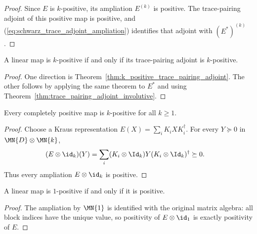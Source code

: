\begin{proof}
    \leanok
    Since $E$ is $k$-positive, its ampliation $E^{(k)}$ is positive. The
    trace-pairing adjoint of this positive map is positive, and
    (\ref{eq:schwarz_trace_adjoint_ampliation}) identifies that adjoint with
    $(E^*)^{(k)}$.
\end{proof}

\begin{theorem}
    \label{thm:k_positive_trace_pairing_adjoint_iff}
    \leanok
    A linear map is $k$-positive if and only if its trace-pairing adjoint is
    $k$-positive.
\end{theorem}

\begin{proof}
    \leanok
    One direction is
    Theorem~\ref{thm:k_positive_trace_pairing_adjoint}. The other follows by
    applying the same theorem to $E^*$ and using
    Theorem~\ref{thm:trace_pairing_adjoint_involutive}.
\end{proof}

\begin{theorem}
    \label{thm:cp_implies_k_positive}
    \leanok
    Every completely positive map is $k$-positive for all $k \ge 1$.
\end{theorem}

\begin{proof}
    \leanok
    Choose a Kraus representation $E(X)=\sum_i K_iXK_i^\dagger$. For every
    $Y\succeq0$ in $\MN{D}\otimes\MN{k}$,
    \begin{align}
        (E\otimes\id_k)(Y)
         & =\sum_i (K_i\otimes\Id_k)Y(K_i\otimes\Id_k)^\dagger
        \succeq0.
        \notag
    \end{align}
    Thus every ampliation $E\otimes\id_k$ is positive.
\end{proof}

\begin{theorem}
    \label{thm:one_positive_iff_positive}
    \leanok
    A linear map is $1$-positive if and only if it is positive.
\end{theorem}

\begin{proof}
    \leanok
    The ampliation by $\MN{1}$ is identified with the original matrix algebra:
    all block indices have the unique value, so positivity of
    $E\otimes\id_1$ is exactly positivity of $E$.
\end{proof}

